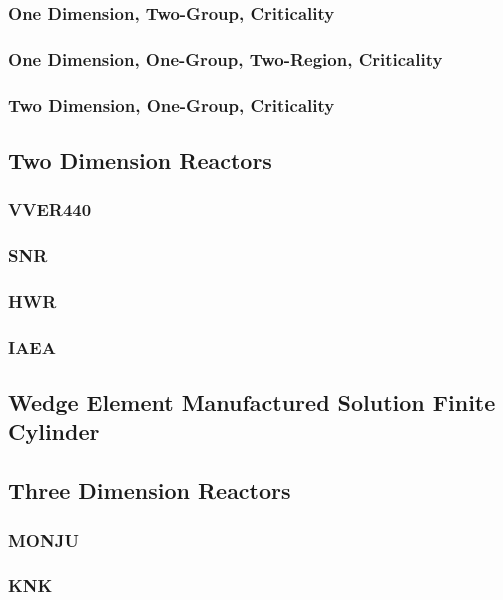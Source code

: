     \subsubsection{One Dimension, Two-Group, Criticality}
    \subsubsection{One Dimension, One-Group, Two-Region, Criticality}
    \subsubsection{Two Dimension, One-Group, Criticality}
  \subsection{Two Dimension Reactors}
    \subsubsection{VVER440}
    \subsubsection{SNR}
    \subsubsection{HWR}
    \subsubsection{IAEA}
  \subsection{Wedge Element Manufactured Solution Finite Cylinder}
  \subsection{Three Dimension Reactors}
    \subsubsection{MONJU}
    \subsubsection{KNK}
